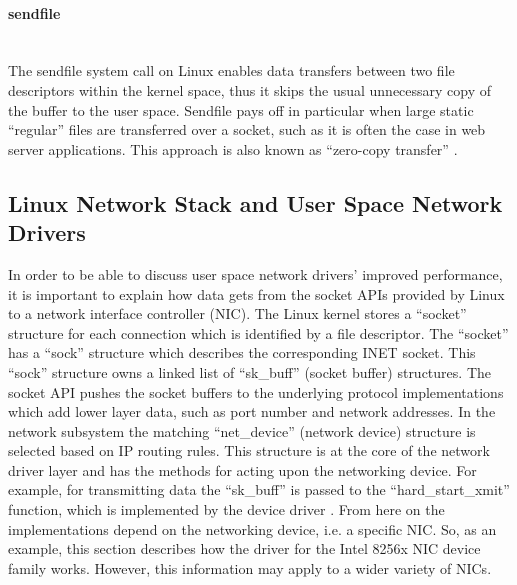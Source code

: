 \paragraph{sendfile}\mbox{}\\
The sendfile system call on Linux enables data transfers between two file descriptors within the kernel space, thus it skips the usual unnecessary copy of the buffer to the user space. Sendfile pays off in particular when large static “regular” files are transferred over a socket, such as it is often the case in web server applications. This approach is also known as “zero-copy transfer” \cite[1260-1262]{kerrisk:linuxapi}\cite{man:sendfile}.

\subsection{Linux Network Stack and User Space Network Drivers}
In order to be able to discuss user space network drivers’ improved performance, it is important to explain how data gets from the socket APIs provided by Linux to a network interface controller (NIC). \newline
The Linux kernel stores a “socket” structure for each connection which is identified by a file descriptor. The “socket” has a “sock” structure which describes the corresponding INET socket. This “sock” structure owns a linked list of “sk\_buff” (socket buffer) structures. 
The socket API pushes the socket buffers to the underlying protocol implementations which add lower layer data, such as port number and network addresses. \newline
In the network subsystem the matching “net\_device” (network device) structure is selected based on IP routing rules. This structure is at the core of the network driver layer and has the methods for acting upon the networking device. For example, for transmitting data the “sk\_buff” is passed to the “hard\_start\_xmit” function, which is implemented by the device driver \cite{coru:device_drivers, linux:networking}. \newline
From here on the implementations depend on the networking device, i.e. a specific NIC. So, as an example, this section describes how the driver for the Intel 8256x NIC device family works. However, this information may apply to a wider variety of NICs. \newline
